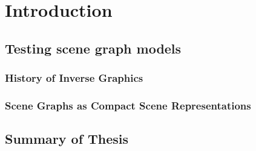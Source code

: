 \chapter{Introduction}

\section{Testing scene graph models}

\subsection{History of Inverse Graphics}

\subsection{Scene Graphs as Compact Scene Representations}


\section{Summary of Thesis}

\todo
